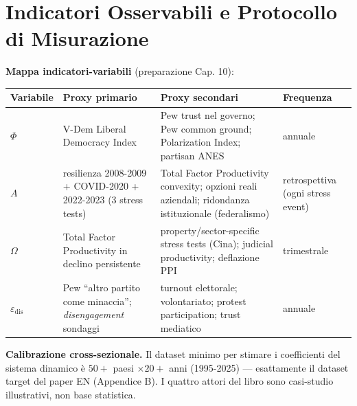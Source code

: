 \section{Indicatori Osservabili e Protocollo di
Misurazione}\label{indicatori-osservabili-e-protocollo-di-misurazione}

\Proved{} \textbf{Mappa indicatori-variabili} (preparazione Cap. 10):

{\def\LTcaptype{none} %
{\small\begin{longtable}[]{@{}
  >{\raggedright\arraybackslash}p{}
  >{\raggedright\arraybackslash}p{}
  >{\raggedright\arraybackslash}p{}
  >{\raggedright\arraybackslash}p{}@{}}
\toprule\noalign{}
\begin{minipage}[b]{\linewidth}\raggedright
Variabile
\end{minipage} & \begin{minipage}[b]{\linewidth}\raggedright
Proxy primario
\end{minipage} & \begin{minipage}[b]{\linewidth}\raggedright
Proxy secondari
\end{minipage} & \begin{minipage}[b]{\linewidth}\raggedright
Frequenza
\end{minipage} \\
\midrule\noalign{}
\endhead
\bottomrule\noalign{}
\endlastfoot
\(\Phi\) & V-Dem Liberal Democracy Index & Pew trust nel governo; Pew
common ground; Polarization Index; partisan ANES & annuale \\
\(A\) & resilienza 2008-2009 + COVID-2020 + 2022-2023 (3 stress tests) &
Total Factor Productivity convexity; opzioni reali aziendali; ridondanza
istituzionale (federalismo) & retrospettiva (ogni stress event) \\
\(\Omega\) & Total Factor Productivity in declino persistente &
property/sector-specific stress tests (Cina); judicial productivity;
deflazione PPI & trimestrale \\
\(\varepsilon_{\text{dis}}\) & Pew ``altro partito come minaccia'';
\emph{disengagement} sondaggi & turnout elettorale; volontariato;
protest participation; trust mediatico & annuale \\
\end{longtable}}
}

\Hypoth{} \textbf{Calibrazione cross-sezionale.} Il dataset minimo per
stimare i coefficienti del sistema dinamico è \(50+\) paesi
\(\times 20+\) anni (1995-2025) --- esattamente il dataset target del
paper EN (Appendice B). I quattro attori del libro sono casi-studio
illustrativi, non base statistica.


